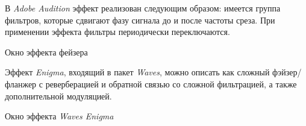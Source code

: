 \documentclass{beamer}
\begin{document}
\begin{frame}
  В \textit{Adobe Audition} эффект реализован следующим образом: имеется группа фильтров, которые сдвигают фазу сигнала до и после частоты среза. При применении эффекта фильтры периодически переключаются.

  \begin{block}{Окно эффекта фейзера}
  \end{block}
\end{frame}

\begin{frame}
  Эффект \emph{Enigma}, входящий в пакет \emph{Waves}, можно описать как сложный фэйзер/фланжер с реверберацией и обратной связью со сложной фильтрацией, а также дополнительной модуляцией.

  \begin{block}{Окно эффекта \emph{Waves Enigma}}
  \end{block}
\end{frame}
\end{document}
